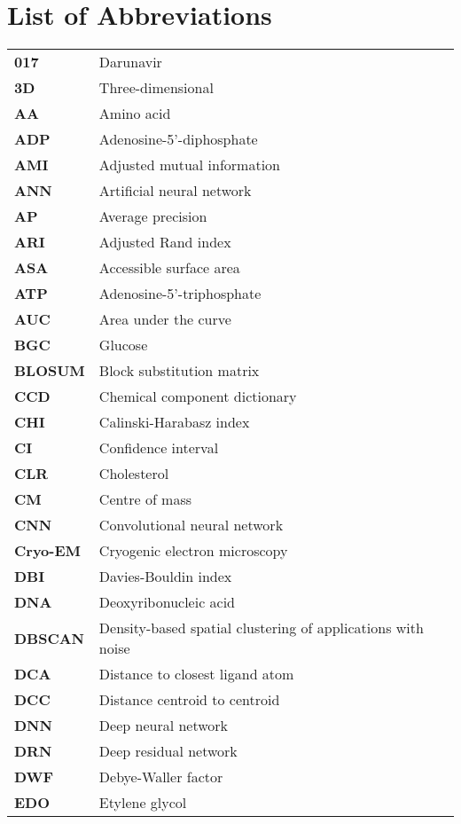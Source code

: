 \chapter*{List of Abbreviations}

\begin{longtable}[l]{@{}p{2.5cm}p{12cm}@{}}
\textbf{017} & Darunavir \\
\textbf{3D} & Three-dimensional \\
\textbf{AA} & Amino acid \\
\textbf{ADP} & Adenosine-5'-diphosphate \\
\textbf{AMI} & Adjusted mutual information \\
\textbf{ANN} & Artificial neural network \\
\textbf{AP} & Average precision \\
\textbf{ARI} & Adjusted Rand index \\
\textbf{ASA} & Accessible surface area \\
\textbf{ATP} & Adenosine-5’-triphosphate \\
\textbf{AUC} & Area under the curve \\
\textbf{BGC} & Glucose \\
\textbf{BLOSUM} & Block substitution matrix \\
\textbf{CCD} & Chemical component dictionary \\
\textbf{CHI} & Calinski-Harabasz index \\
\textbf{CI} & Confidence interval \\
\textbf{CLR} & Cholesterol \\
\textbf{CM} & Centre of mass \\
\textbf{CNN} & Convolutional neural network \\
\textbf{Cryo-EM} & Cryogenic electron microscopy \\
\textbf{DBI} & Davies-Bouldin index \\
\textbf{DNA} & Deoxyribonucleic acid \\
\textbf{DBSCAN} & Density-based spatial clustering of applications with noise \\
\textbf{DCA} & Distance to closest ligand atom \\
\textbf{DCC} & Distance centroid to centroid \\
\textbf{DNN} & Deep neural network \\
\textbf{DRN} & Deep residual network \\
\textbf{DWF} & Debye-Waller factor \\
\textbf{EDO} & Etylene glycol \\

\end{longtable}
